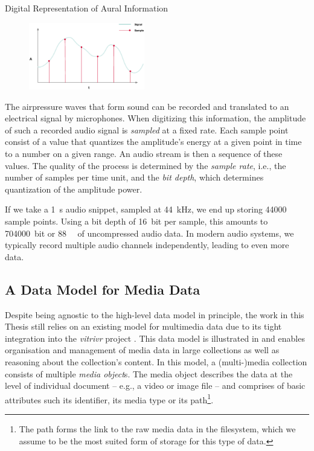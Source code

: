 \begin{example}[label=example:representation_audio_information]{Digital Representation of Aural Information}{}
    \begin{figure}
        \includegraphics[width=0.45\textwidth]{figures/example-audio-signal.eps}
    \end{figure}
    The airpressure waves that form sound can be recorded and translated to an electrical signal by microphones. When digitizing this information, the amplitude of such a recorded audio signal is \emph{sampled} at a fixed rate. Each sample point consist of a value that quantizes the amplitude's energy at a given point in time to a number on a given range. An audio stream is then a sequence of these values. The quality of the process is determined by the \emph{sample rate}, i.e., the number of samples per time unit, and the \emph{bit depth}, which determines quantization of the amplitude power.

    If we take a \SI{1}{\second} audio snippet, sampled at \SI{44}{\kilo\hertz}, we end up storing \num{44000} sample points. Using a bit depth of \SI{16}{bit} per sample, this amounts to \SI{704000}{bit} or \SI{88}{\kilo\byte} of uncompressed audio data. In modern audio systems, we typically record multiple audio channels independently, leading to even more data.
\end{example}

\subsection{A Data Model for Media Data}

Despite being agnostic to the high-level data model in principle, the work in this Thesis still relies on an existing model for multimedia data due to its tight integration into the \emph{vitrivr} project \cite{Rossetto:2016vitrivr,Gasser:2019multimodal,Heller:2020multi}. This data model is illustrated in  and enables organisation and management of media data in large collections as well as reasoning about the collection's content. In this model, a (multi-)media collection consists of multiple \emph{media object}s. The media object describes the data at the level of individual document -- e.g., a video or image file -- and comprises of basic attributes such its identifier, its media type or its path\footnote{The path forms the link to the raw media data in the filesystem, which we assume to be the most suited form of storage for this type of data.}. 

